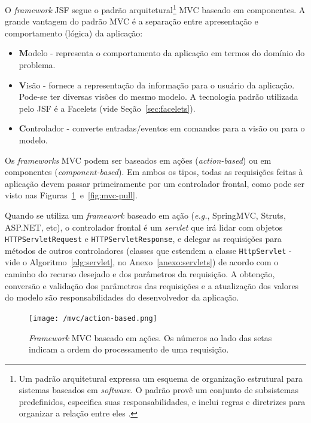 \documentclass[
  10.5pt,				  %
	openright,			%
	twoside,			  %
  a5paper,
  chapter=TITLE,	%
	section=TITLE,	%
  hyphens,        %
	english,        %
	brazil          %
]{abntex2}
\begin{document}
O \emph{framework} JSF segue o padrão arquitetural\footnote{Um padrão arquitetural expressa um esquema de organização estrutural para sistemas baseados em \emph{software}. O padrão provê um conjunto de subsistemas predefinidos, especifica suas responsabilidades, e inclui regras e diretrizes para organizar a relação entre eles \cite{buschmann96}.} MVC baseado em componentes. A grande vantagem do padrão MVC é a separação entre apresentação e comportamento (lógica) da aplicação:

\begin{itemize}
  \item \textbf{M}odelo - representa o comportamento da aplicação em termos do domínio do problema.
  \item \textbf{V}isão - fornece a representação da informação para o usuário da aplicação. Pode-se ter diversas visões do mesmo modelo. A tecnologia padrão utilizada pelo JSF é a Facelets (vide Seção~\ref{sec:facelets}).
  \item \textbf{C}ontrolador - converte entradas/eventos em comandos para a visão ou para o modelo.
\end{itemize}

Os \emph{frameworks} MVC podem ser baseados em ações (\emph{action-based}) ou em componentes (\emph{component-based}). Em ambos os tipos, todas as requisições feitas à aplicação devem passar primeiramente por um controlador frontal, como pode ser visto nas Figuras~\ref{fig:mvc-push}~e~\ref{fig:mvc-pull}.

Quando se utiliza um \emph{framework} baseado em ação (\emph{e.g.}, SpringMVC, Struts, ASP.NET, etc), o controlador frontal é um \emph{servlet} que irá lidar com objetos \texttt{HTTPServletRequest} e \texttt{HTTPServletResponse}, e delegar as requisições para métodos de outros controladores (classes que estendem a classe \texttt{HttpServlet} - vide o Algoritmo~\ref{alg:servlet}, no Anexo~\ref{anexo:servlets}) de acordo com o caminho do recurso desejado e dos parâmetros da requisição. A obtenção, conversão e validação dos parâmetros das requisições e a atualização dos valores do modelo são responsabilidades do desenvolvedor da aplicação.

\begin{figure}[!ht]
  \caption{\label{fig:mvc-push}\emph{Framework} MVC baseado em ações. Os números ao lado das setas indicam a ordem do processamento de uma requisição.}
  \begin{center}
    \texttt{[image: /mvc/action-based.png]}
  \end{center}
\end{figure}
\end{document}

